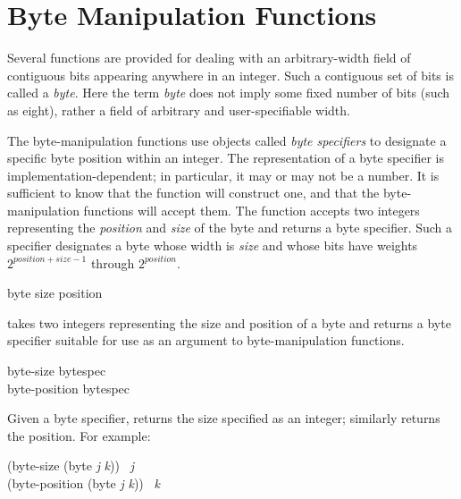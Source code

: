 \section{Byte Manipulation Functions}

Several functions are provided for dealing with an arbitrary-width field of
contiguous bits appearing anywhere in an integer.
Such a contiguous set of bits is called a \emph{byte}.
Here the term \emph{byte} does not imply some fixed number of bits
(such as eight), rather a field of arbitrary and user-specifiable width.

The byte-manipulation functions use objects called \emph{byte specifiers} to
designate a specific byte position within an integer.
The representation of a byte specifier is implementation-dependent;
in particular, it may or may not be a number.
It is sufficient to know that the function  will construct one,
and that the byte-manipulation functions will accept them.
The function  accepts two integers representing
the \emph{position} and \emph{size} of the byte and returns
a byte specifier.
Such a specifier designates a byte whose width is \emph{size}
and whose bits have weights $ 2^{position+size-1} $
through $ 2^{position} $.

\begin{defun}[Function]
byte size position

 takes two integers representing the size and position
of a byte and returns a byte specifier suitable for use
as an argument to byte-manipulation functions.
\end{defun}

\begin{defun}[Function]
byte-size bytespec \\
byte-position bytespec

Given a byte specifier,  returns the size specified as an
integer;  similarly returns the position.
For example:
\begin{lisp}
(byte-size (byte \emph{j} \emph{k})) \EQ\ \emph{j} \\
(byte-position (byte \emph{j} \emph{k})) \EQ\ \emph{k}
\end{lisp}
\end{defun}

